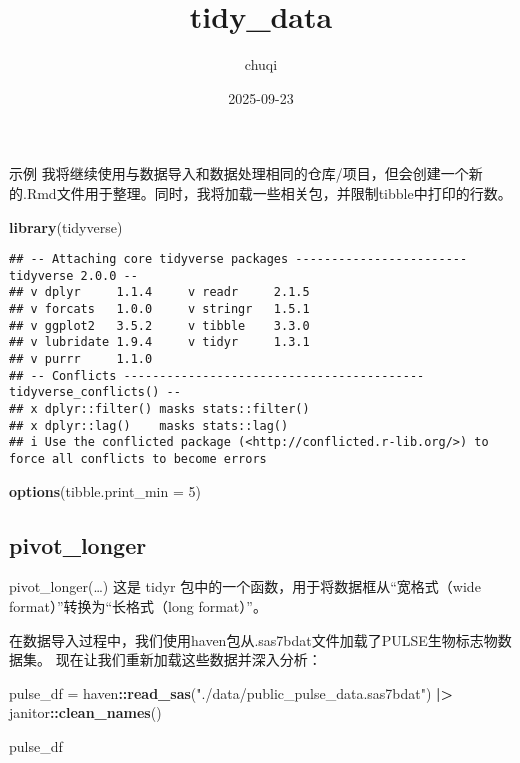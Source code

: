 \documentclass[
]{article}
\title{tidy\_data}
\author{chuqi}
\date{2025-09-23}
\newenvironment{Shaded}{\begin{snugshade}}{\end{snugshade}}
\newcommand{\AttributeTok}[1]{\textcolor[rgb]{0.13,0.29,0.53}{#1}}
\newcommand{\DecValTok}[1]{\textcolor[rgb]{0.00,0.00,0.81}{#1}}
\newcommand{\FunctionTok}[1]{\textcolor[rgb]{0.13,0.29,0.53}{\textbf{#1}}}
\newcommand{\NormalTok}[1]{#1}
\newcommand{\OtherTok}[1]{\textcolor[rgb]{0.56,0.35,0.01}{#1}}
\newcommand{\SpecialCharTok}[1]{\textcolor[rgb]{0.81,0.36,0.00}{\textbf{#1}}}
\newcommand{\StringTok}[1]{\textcolor[rgb]{0.31,0.60,0.02}{#1}}
\begin{document}
\maketitle

示例
我将继续使用与数据导入和数据处理相同的仓库/项目，但会创建一个新的.Rmd文件用于整理。同时，我将加载一些相关包，并限制tibble中打印的行数。

\begin{Shaded}
\begin{Highlighting}[]
\FunctionTok{library}\NormalTok{(tidyverse)}
\end{Highlighting}
\end{Shaded}

\begin{verbatim}
## -- Attaching core tidyverse packages ------------------------ tidyverse 2.0.0 --
## v dplyr     1.1.4     v readr     2.1.5
## v forcats   1.0.0     v stringr   1.5.1
## v ggplot2   3.5.2     v tibble    3.3.0
## v lubridate 1.9.4     v tidyr     1.3.1
## v purrr     1.1.0     
## -- Conflicts ------------------------------------------ tidyverse_conflicts() --
## x dplyr::filter() masks stats::filter()
## x dplyr::lag()    masks stats::lag()
## i Use the conflicted package (<http://conflicted.r-lib.org/>) to force all conflicts to become errors
\end{verbatim}

\begin{Shaded}
\begin{Highlighting}[]
\FunctionTok{options}\NormalTok{(}\AttributeTok{tibble.print\_min =} \DecValTok{5}\NormalTok{)}
\end{Highlighting}
\end{Shaded}

\subsection{pivot\_longer}\label{pivot_longer}

pivot\_longer(\ldots) 这是 tidyr
包中的一个函数，用于将数据框从``宽格式（wide
format）''转换为``长格式（long format）''。

在数据导入过程中，我们使用haven包从.sas7bdat文件加载了PULSE生物标志物数据集。
现在让我们重新加载这些数据并深入分析：

\begin{Shaded}
\begin{Highlighting}[]
\NormalTok{pulse\_df }\OtherTok{=} 
\NormalTok{  haven}\SpecialCharTok{::}\FunctionTok{read\_sas}\NormalTok{(}\StringTok{"./data/public\_pulse\_data.sas7bdat"}\NormalTok{) }\SpecialCharTok{|\textgreater{}}
\NormalTok{  janitor}\SpecialCharTok{::}\FunctionTok{clean\_names}\NormalTok{()}

\NormalTok{pulse\_df}
\end{Highlighting}
\end{Shaded}
\end{document}
